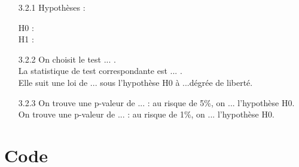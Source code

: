 \documentclass{article}
\begin{document}
\begin{itemize}
	\item [3.2.1]
Hypothèses : 
\begin{description}
    \item[H0 :]
    \item[H1 :]
\end{description}
\item[3.2.2]
On choisit le test ... .\\
La statistique de test correspondante est ... .\\
Elle suit une loi de ... sous l'hypothèse H0 à ...dégrée de liberté.\\
\item[3.2.3]
On trouve une p-valeur de ... : au risque de 5\%, on ... l'hypothèse H0.\\
On trouve une p-valeur de ... : au risque de 1\%, on ... l'hypothèse H0.\\
\end{itemize}

\newpage
\appendix

\section{Code}
%
\end{document}
